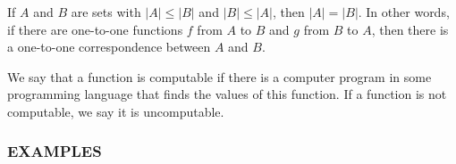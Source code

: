 \begin{thm} If $A$ and $B$ are sets with $|A| \leq |B|$ and $|B| \leq |A|$, then $|A| = |B|$. In other words, if there are one-to-one functions $f$ from $A$ to $B$ and $g$ from $B$ to $A$, then there is a one-to-one correspondence between $A$ and $B$.
\end{thm}
\begin{defn}[Computability]
We say that a function is computable if there is a computer program in some programming language that finds the values of this function. If a function is not computable, we say it is uncomputable.

\end{defn}
\newpage
\subsubsection{EXAMPLES}
\newpage
